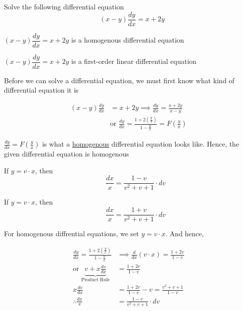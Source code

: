 \documentclass[14pt,fleqn]{extarticle}
\begin{document}
\newcommand\sq{ \left(v + \frac{1}{2} \right)^2 + \left( \frac{\sqrt{3}}{2}\right)^2} 
\newcommand\dnm{ \left(v^2 + v + 1\right)}

Solve the following differential equation 
\[ \quad \left(x-y \right)\frac{dy}{dx} = x + 2y \]%

\newcard

$\left(x-y \right)\dfrac{dy}{dx} = x + 2y$ is a homogenous differential equation 

\newcard 

$\left(x-y \right)\dfrac{dy}{dx} = x + 2y$ is a first-order linear differential equation 

\newcard 

Before we can solve a differential equation, we must first know what kind of differential equation it is 

\begin{align}
	\left(x-y \right)\frac{dy}{dx} & = x + 2y \implies \frac{dy}{dx} = \frac{x+2y}{x-y} \\ 
	&\text{or } \frac{dy}{dx} = \frac{1 + 2\left(\frac{y}{x} \right)}{1- \frac{y}{x}} = F \left(\frac{y}{x} \right) 
\end{align}

$\frac{dy}{dx} = F \left(\frac{y}{x} \right)$ is what a \underline{homogenous} differential equation looks like. Hence, the given differential equation is homogenous 

\newcard 

If $ y = v\cdot x$, then 
\[ \qquad \frac{dx}{x} = \frac{1-v}{v^2+v+1}\cdot dv \]

\newcard 

If $ y = v\cdot x$, then 
\[ \qquad \frac{dx}{x} = \frac{1+v}{v^2+v+1}\cdot dv \]

\newcard 

For homogenous diffrential equations, we set $y = v\cdot x$. And hence, 

\begin{align}
\frac{dy}{dx} =  \frac{1+2 \left(\frac{y}{x} \right)}{1 - \frac{y}{x}} &\implies \frac{d}{dx} \left(v\cdot x \right) = \frac{1+2v}{1-v} \\
\text{or } \underbrace{v + x \frac{dv}{dx}}_{\text{Product Rule}} &= \frac{1+2v}{1-v} \\
x \frac{dv}{dx} &= \frac{1+2v}{1-v} - v = \frac{v^2+v+1}{1-v} \\
\therefore \frac{dx}{x} &= \frac{1-v}{v^2+v+1}\cdot dv
\end{align}

\newcard 
\end{document}
